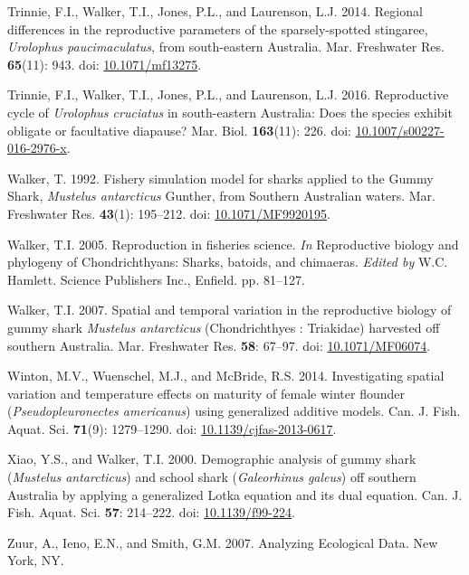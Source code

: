 \documentclass[
]{article}
\newenvironment{CSLReferences}%
  {}%
  {\par}
\begin{document}
\begin{CSLReferences}{1}{0}
Trinnie, F.I., Walker, T.I., Jones, P.L., and Laurenson, L.J. 2014. Regional differences in the reproductive parameters of the sparsely-spotted stingaree, {\emph{Urolophus paucimaculatus}}, from south-eastern Australia. Mar. Freshwater Res. \textbf{65}(11): 943. doi: \href{https://doi.org/10.1071/mf13275}{10.1071/mf13275}.

Trinnie, F.I., Walker, T.I., Jones, P.L., and Laurenson, L.J. 2016. Reproductive cycle of \emph{{Urolophus} cruciatus} in south-eastern {Australia}: {Does} the species exhibit obligate or facultative diapause? Mar. Biol. \textbf{163}(11): 226. doi: \href{https://doi.org/10.1007/s00227-016-2976-x}{10.1007/s00227-016-2976-x}.

Walker, T. 1992. Fishery simulation model for sharks applied to the {Gummy} {Shark}, \emph{{Mustelus} antarcticus} {Gunther}, from {Southern} {Australian} waters. Mar. Freshwater Res. \textbf{43}(1): 195--212. doi: \href{https://doi.org/10.1071/MF9920195}{10.1071/MF9920195}.

Walker, T.I. 2005. Reproduction in fisheries science. \emph{In} Reproductive biology and phylogeny of {Chondrichthyans}: Sharks, batoids, and chimaeras. \emph{Edited by} W.C. Hamlett. Science Publishers Inc., Enfield. pp. 81--127.

Walker, T.I. 2007. Spatial and temporal variation in the reproductive biology of gummy shark \emph{{Mustelus} antarcticus} ({Chondrichthyes} : {Triakidae}) harvested off southern {Australia}. Mar. Freshwater Res. \textbf{58}: 67--97. doi: \href{https://doi.org/10.1071/MF06074}{10.1071/MF06074}.

Winton, M.V., Wuenschel, M.J., and McBride, R.S. 2014. Investigating spatial variation and temperature effects on maturity of female winter flounder ({\emph{Pseudopleuronectes americanus}}) using generalized additive models. Can. J. Fish. Aquat. Sci. \textbf{71}(9): 1279--1290. doi: \href{https://doi.org/10.1139/cjfas-2013-0617}{10.1139/cjfas-2013-0617}.

Xiao, Y.S., and Walker, T.I. 2000. Demographic analysis of gummy shark (\emph{{Mustelus} antarcticus}) and school shark (\emph{{Galeorhinus} galeus}) off southern {Australia} by applying a generalized {Lotka} equation and its dual equation. Can. J. Fish. Aquat. Sci. \textbf{57}: 214--222. doi: \href{https://doi.org/10.1139/f99-224}{10.1139/f99-224}.

Zuur, A., Ieno, E.N., and Smith, G.M. 2007. Analyzing {Ecological} {Data}. New York, NY.

\end{CSLReferences}
\end{document}
